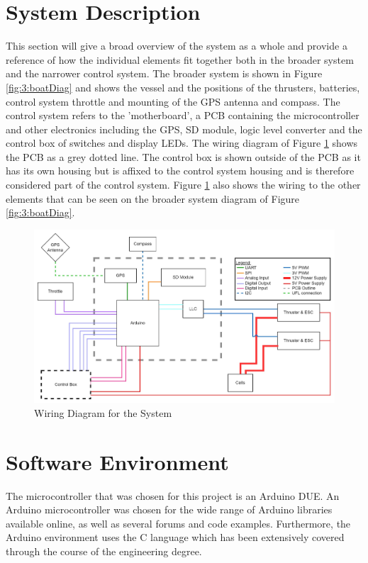 \section{System Description}
This section will give a broad overview of the system as a whole and  provide a reference of how the individual elements fit together both in the broader system and the narrower control system. The broader system is shown in Figure \ref{fig:3:boatDiag} and shows the vessel and the positions of the thrusters, batteries, control system throttle and mounting of the GPS antenna and compass. The control system refers to the 'motherboard', a PCB containing the microcontroller and other electronics including the GPS, SD module, logic level converter and the control box of switches and display LEDs. The wiring diagram of Figure \ref{fig:3:wiring} shows the PCB as a grey dotted line. The control box is shown outside of the PCB as it has its own housing but is affixed to the control system housing and is therefore considered part of the control system. Figure \ref{fig:3:wiring} also shows the wiring to the other elements that can be seen on the broader system diagram of Figure \ref{fig:3:boatDiag}. \par
\begin{figure}[ht]
	\begin{center}
		\includegraphics[width =\linewidth]{figures/Wiring diagram.jpg}
		\caption{Wiring Diagram for the System}
		\label{fig:3:wiring}
	\end{center}
\end{figure}

\section{Software Environment}
The microcontroller that was chosen for this project is an Arduino DUE. An Arduino microcontroller was chosen for the wide range of Arduino libraries available online, as well as several forums and code examples. Furthermore, the Arduino environment uses the C language which has been extensively covered through the course of the engineering degree. \par
